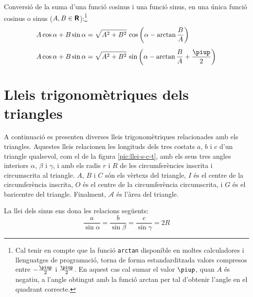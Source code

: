 Conversió de la suma d'una funció cosinus i una funció sinus, en una única
funció cosinus o sinus ($A,B\in{\ensuremath{\boldsymbol{\mathsf{R}}}}$):\footnote{Cal tenir en compte que la funció \texttt{arctan} disponible en moltes calculadores i llenguatges de programació, torna de forma estandarditzada valors compresos entre $-\frac{\piup}{2}$ i $\frac{\piup}{2}$. En aquest cas cal sumar el valor $\piup$, quan $A$ és negatiu, a l'angle obtingut amb la funció \textsf{arctan} per tal d'obtenir l'angle en el quadrant correcte.}
\begin{subequations}
\begin{align}
    A \cos \alpha + B \sin \alpha &= \sqrt{A^2+B^2}\, \cos \left(\alpha - \arctan\dfrac{B}{A}\right)\label{eq:AcosBsin}\\[1ex]
    A \cos \alpha + B \sin \alpha &= \sqrt{A^2+B^2}\, \sin \left(\alpha - \arctan\dfrac{B}{A}+\dfrac{\piup}{2}\right)\label{eq:AcosBsinS}
\end{align}
\end{subequations}

\break

\section{Lleis trigonomètriques dels triangles}\label{sec:llei-s-c-t}

A continuació es presenten diverses lleis trigonomètriques relacionades amb els triangles. Aquestes lleis relacionen les longituds dels tres costats $a$, $b$ i $c$ d'un triangle qualsevol, com el de
la figura \vref{pic:llei-s-c-t}, amb els seus tres angles interiors
$\alpha$, $\beta$ i $\gamma$, i amb els radis $r$ i $R$ de les circumferències inscrita i circumscrita al triangle. $A$, $B$ i $C$ són els vèrtexs del triangle, $I$ és el centre de la circumferència inscrita, $O$   és el centre de la circumferència circumscrita, i $G$ és el baricentre del triangle. Finalment, $\mathscr{A}$ és l'àrea del triangle.

\begin{center}
    
     \label{pic:llei-s-c-t}
\end{center}

La llei dels sinus ens dona les relacions següents:
\begin{equation}
    \frac{a}{\sin\alpha} = \frac{b}{\sin\beta} =
    \frac{c}{\sin\gamma} = 2 R
\end{equation}

